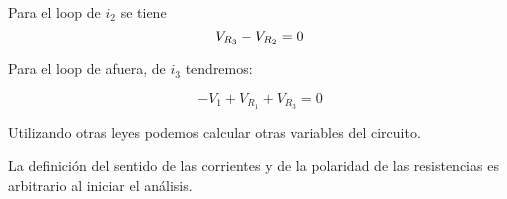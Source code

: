 \begin{example}
    Para el loop de $i_2$ se tiene
    \begin{equation*}
    \notag V_{R_3} - V_{R_2} = 0
    \end{equation*}

    Para el loop de afuera, de $i_3$ tendremos:

    \begin{equation*}
    -V_1 + V_{R_1} + V_{R_3} =0
    \end{equation*}

    Utilizando otras leyes podemos calcular otras variables del circuito.

    \begin{remark}
        La definición del sentido de las corrientes y de la polaridad de las resistencias es arbitrario al iniciar el análisis.
    \end{remark}
\end{example}

\newpage
